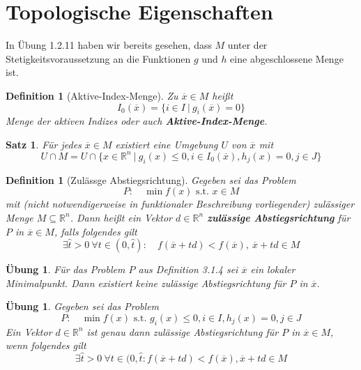\documentclass[11pt]{scrreprt}
\newcounter{thm}
\theoremstyle{thmstyle}
\numberwithin{thm}{section}
\newtheorem{definition}[thm]{Definition}
\newtheorem{satz}[thm]{Satz}
\newtheorem{uebung}[thm]{Übung}
\begin{document}
\section*{Topologische Eigenschaften}

In Übung 1.2.11 haben wir bereits gesehen, dass $M$ unter der Stetigkeitsvoraussetzung an die Funktionen $g$ und $h$ eine abgeschlossene Menge ist.

\begin{definition}[Aktive-Index-Menge]
	Zu $\overline{x} \in M$ heißt
	$$ I_0(\overline{x}) = \big\{ i \in I ~|~ g_i(\overline{x}) = 0 \big\} $$
	Menge der aktiven Indizes oder auch \textbf{Aktive-Index-Menge}.
\end{definition}

\setcounter{thm}{2}

\begin{satz}
	Für jedes $\overline{x} \in M$ existiert eine Umgebung $U$ von $\overline{x}$ mit
	$$ U \cap M = U \cap \big\{ x \in \mathbb{R}^n ~|~ g_i(x) \leq 0, i \in I_0(\overline{x}), h_j(x) = 0, j \in J \big\} $$
\end{satz}

\begin{definition}[Zulässge Abstiegsrichtung]
	Gegeben sei das Problem
		$$ P: \quad \min f(x) \text{ s.t. } x \in M $$
	mit (nicht notwendigerweise in funktionaler Beschreibung vorliegender) zulässiger Menge $M \subseteq \mathbb{R}^n$. Dann heißt ein Vektor $d \in \mathbb{R}^n$ \textbf{zulässige Abstiegsrichtung} für $P$ in $\overline{x} \in M$, falls folgendes gilt
		$$ \exists \hat{t} > 0 ~\forall t \in (0, \hat{t}): \quad f(\overline{x} + td) < f(\overline{x}), ~\overline{x} + td \in M $$
\end{definition}

\begin{uebung}
	Für das Problem $P$ aus Definition 3.1.4 sei $\overline{x}$ ein lokaler Minimalpunkt. Dann existiert keine zulässige Abstiegsrichtung für $P$ in $\overline{x}$.
\end{uebung}

\begin{uebung}
	Gegeben sei das Problem
	$$ P: \quad \min f(x) \text{ s.t. } g_i(x) \leq 0, i \in I, h_j(x) = 0, j \in J $$
	Ein Vektor $d \in \mathbb{R}^n$ ist genau dann zulässige Abstiegsrichtung für $P$ in $\overline{x} \in M$, wenn folgendes gilt
	$$ \exists \hat{t} > 0 ~\forall t \in (0, \hat{t}: f(\overline{x} + td) < f(\overline{x}), \overline{x} + td \in M  $$
\end{uebung}
\end{document}
